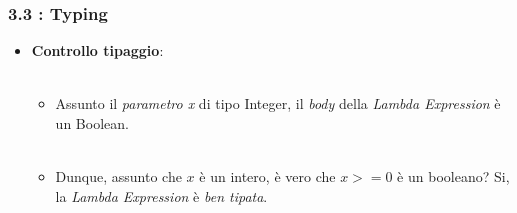 \documentclass{beamer}
\begin{document}

\begin{frame}[fragile]
	\frametitle{\textbf{3.3 : Typing}}
	\begin{itemize}
		\item
			\textbf{Controllo tipaggio}:\\\
			\begin{itemize}
				\item 
					Assunto il \textit{parametro x} di tipo Integer, il \textit{body} della \textit{Lambda Expression} è un Boolean.\\\
				\item 
					Dunque, assunto che $x$ è un intero, è vero che $x>=0$ è un booleano? Si, la \textit{Lambda Expression} è \textit{ben tipata}.
			\end{itemize}
	\end{itemize}
\end{frame}

\end{document}
